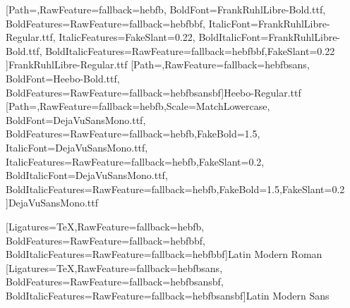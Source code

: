 [Path={\hllpdffontdir},RawFeature={fallback=hebfb},
  BoldFont={FrankRuhlLibre-Bold.ttf},
  BoldFeatures={RawFeature={fallback=hebfbbf}},   %
  ItalicFont={FrankRuhlLibre-Regular.ttf}, ItalicFeatures={FakeSlant=0.22},
  BoldItalicFont={FrankRuhlLibre-Bold.ttf}, BoldItalicFeatures={RawFeature={fallback=hebfbbf},FakeSlant=0.22}
  ]{FrankRuhlLibre-Regular.ttf}
[Path={\hllpdffontdir},RawFeature={fallback=hebfbsans},
  BoldFont={Heebo-Bold.ttf},
  BoldFeatures={RawFeature={fallback=hebfbsansbf}}]{Heebo-Regular.ttf}
[Path={\hllpdffontdir},RawFeature={fallback=hebfb},Scale=MatchLowercase,
  BoldFont={DejaVuSansMono.ttf},
  BoldFeatures={RawFeature={fallback=hebfb},FakeBold=1.5},
  ItalicFont={DejaVuSansMono.ttf},
  ItalicFeatures={RawFeature={fallback=hebfb},FakeSlant=0.2},
  BoldItalicFont={DejaVuSansMono.ttf},
  BoldItalicFeatures={RawFeature={fallback=hebfb},FakeBold=1.5,FakeSlant=0.2}
  ]{DejaVuSansMono.ttf}

\ifx\lakitlanguageprofile\hllpdfhebrew\else
  [Ligatures=TeX,RawFeature={fallback=hebfb},
    BoldFeatures={RawFeature={fallback=hebfbbf}},
    BoldItalicFeatures={RawFeature={fallback=hebfbbf}}]{Latin Modern Roman}
  [Ligatures=TeX,RawFeature={fallback=hebfbsans},
    BoldFeatures={RawFeature={fallback=hebfbsansbf}},
    BoldItalicFeatures={RawFeature={fallback=hebfbsansbf}}]{Latin Modern Sans}
\fi

